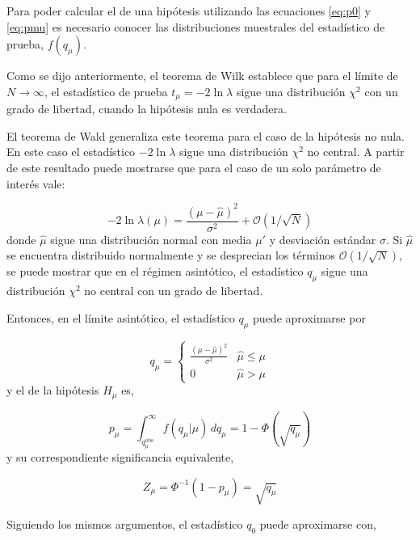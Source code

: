 Para poder calcular el {\pvalue} de una hipótesis utilizando las ecuaciones
\eqref{eq:p0} y \eqref{eq:pmu} es necesario conocer las distribuciones muestrales
del estadístico de prueba, $f(q_\mu)$.

Como se dijo anteriormente, el teorema de Wilk establece que para el límite de
$N\to\infty$, el estadístico de prueba $t_\mu = -2\ln \lambda$ sigue una
distribución $\chi^2$ con un grado de libertad, cuando la hipótesis nula es verdadera.

El teorema de Wald\cite{WaldTheo} generaliza este teorema para el caso de la hipótesis no nula.
En este caso el estadístico $-2\ln\lambda$ sigue una distribución $\chi^2$ no central.
A partir de este resultado puede mostrarse que para el caso de un solo parámetro de interés vale:

\begin{equation}
  -2 \ln \lambda(\mu) = \frac{(\mu - \hat{\mu})^2}{\sigma^2} + \mathcal{O}(1/\sqrt{N})
\end{equation}
%
donde $\hat{\mu}$ sigue una distribución normal con media $\mu'$ y desviación
estándar $\sigma$. Si $\hat{\mu}$ se encuentra distribuido normalmente y se
desprecian los términos $\mathcal{O}(1/\sqrt{N})$, se puede mostrar que en el
régimen asintótico, el estadístico $q_\mu$ sigue una distribución $\chi^2$ no
central con un grado de libertad.

Entonces, en el límite asintótico, el estadístico $q_\mu$ puede aproximarse por

\begin{equation}
  q_\mu =
  \begin{cases}
    \frac{(\mu-\hat{\mu})^2}{\sigma^2} & \hat{\mu} \leq \mu \\
    0 & \hat{\mu} > \mu
  \end{cases}
\end{equation}
%
y el {\pvalue} de la hipótesis $H_\mu$ es,

\begin{equation}
  p_\mu = \int_{q_{\mu}^{\text{obs}}}^{\infty} f(q_\mu|\mu) \, dq_\mu = 1 - \Phi(\sqrt{q_\mu})
\end{equation}
%
y su correspondiente significancia equivalente,

\begin{equation}
  Z_\mu = \Phi^{-1}(1-p_\mu) = \sqrt{q_\mu}
\end{equation}

Siguiendo los mismos argumentos, el estadístico $q_0$ puede aproximarse con,


